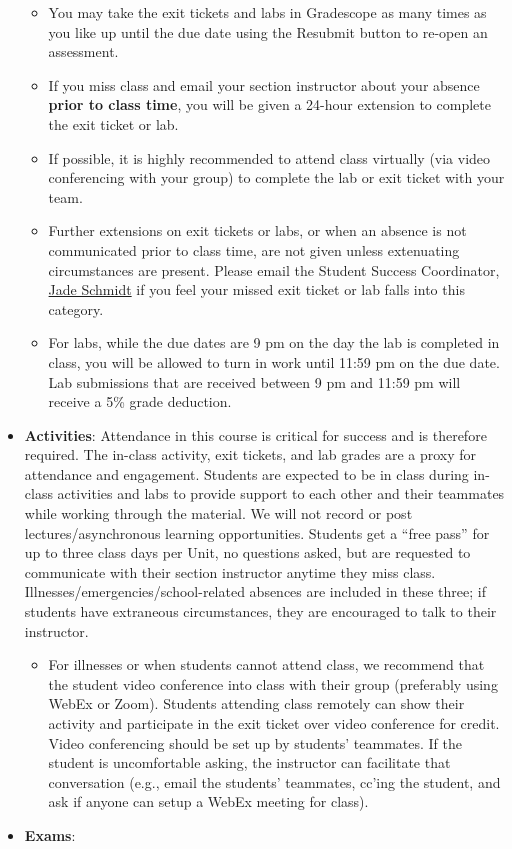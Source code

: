 \documentclass[
]{article}
\providecommand{\tightlist}{%
  \setlength{\itemsep}{0pt}\setlength{\parskip}{0pt}}
\begin{document}
\begin{itemize}
  \begin{itemize}
  \tightlist
  \item
    You may take the exit tickets and labs in Gradescope as many times
    as you like up until the due date using the Resubmit button to
    re-open an assessment.
  \item
    If you miss class and email your section instructor about your
    absence \textbf{prior to class time}, you will be given a 24-hour
    extension to complete the exit ticket or lab.
  \item
    If possible, it is highly recommended to attend class virtually (via
    video conferencing with your group) to complete the lab or exit
    ticket with your team.\\
  \item
    Further extensions on exit tickets or labs, or when an absence is
    not communicated prior to class time, are not given unless
    extenuating circumstances are present. Please email the Student
    Success Coordinator, \href{jade.schmidt2@montana.edu}{Jade Schmidt}
    if you feel your missed exit ticket or lab falls into this category.
  \item
    For labs, while the due dates are 9 pm on the day the lab is
    completed in class, you will be allowed to turn in work until 11:59
    pm on the due date. Lab submissions that are received between 9 pm
    and 11:59 pm will receive a 5\% grade deduction.
  \end{itemize}
\item
  \textbf{Activities}: Attendance in this course is critical for success
  and is therefore required. The in-class activity, exit tickets, and
  lab grades are a proxy for attendance and engagement. Students are
  expected to be in class during in-class activities and labs to provide
  support to each other and their teammates while working through the
  material. We will not record or post lectures/asynchronous learning
  opportunities. Students get a ``free pass'' for up to three class days
  per Unit, no questions asked, but are requested to communicate with
  their section instructor anytime they miss class.
  Illnesses/emergencies/school-related absences are included in these
  three; if students have extraneous circumstances, they are encouraged
  to talk to their instructor.

  \begin{itemize}
  \tightlist
  \item
    For illnesses or when students cannot attend class, we recommend
    that the student video conference into class with their group
    (preferably using WebEx or Zoom). Students attending class remotely
    can show their activity and participate in the exit ticket over
    video conference for credit. Video conferencing should be set up by
    students' teammates. If the student is uncomfortable asking, the
    instructor can facilitate that conversation (e.g., email the
    students' teammates, cc'ing the student, and ask if anyone can setup
    a WebEx meeting for class).
  \end{itemize}
\item
  \textbf{Exams}:


\end{itemize}
\end{document}
